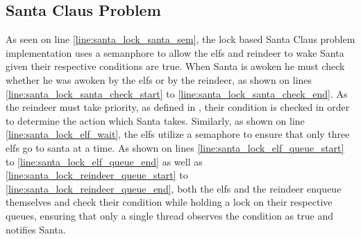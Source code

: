 \subsection{Santa Claus Problem}
As seen on line \ref{line:santa_lock_santa_sem}, the lock based Santa Claus problem implementation uses a semanphore to allow the elfs and reindeer to wake Santa given their respective conditions are true. When Santa is awoken he must check whether he was awoken by the elfs or by the reindeer, as shown on lines \ref{line:santa_lock_santa_check_start} to \ref{line:santa_lock_santa_check_end}. As the reindeer must take priority, as defined in , their condition is checked in order to determine the action which Santa takes. Similarly, as shown on line \ref{line:santa_lock_elf_wait}, the elfs utilize a semaphore to ensure that only three elfs go to santa at a time. As shown on lines \ref{line:santa_lock_elf_queue_start} to \ref{line:santa_lock_elf_queue_end} as well as \ref{line:santa_lock_reindeer_queue_start} to \ref{line:santa_lock_reindeer_queue_end}, both the elfs and the reindeer enqueue themselves and check their condition while holding a lock on their respective queues, ensuring that only a single thread observes the condition as true and notifies Santa.

